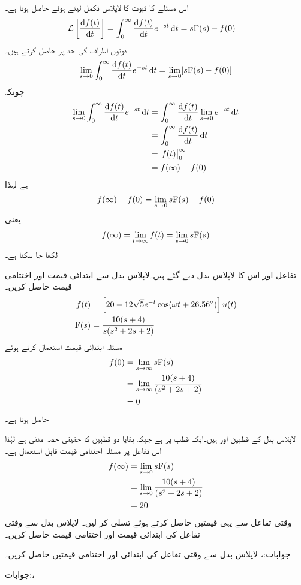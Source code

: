 اس مسئلے کا ثبوت  کا لاپلاس تکمل لیتے ہوئے حاصل ہوتا ہے۔
\begin{align*}
\Laplace\left[\frac{\dif f(t)}{\dif t}\right]&=\int_0^{\infty} \frac{\dif f(t)}{\dif t} e^{-st} \dif t=s\bF(s)-f(0)
\end{align*}
دونوں اطراف کی حد  پر حاصل کرتے ہیں۔
\begin{align*}
\lim_{s \to 0}\int_0^{\infty} \frac{\dif f(t)}{\dif t} e^{-st} \dif t=\lim_{s \to 0}[s\bF(s)-f(0)]
\end{align*}
چونکہ
\begin{align*}
\lim_{s \to 0}\int_0^{\infty} \frac{\dif f(t)}{\dif t} e^{-st} \dif t&=\int_0^{\infty} \frac{\dif f(t)}{\dif t} \lim_{s \to 0}e^{-st} \dif t\\
&=\int_0^{\infty} \frac{\dif f(t)}{\dif t} \dif t\\
&=\left. f(t) \right|_{0}^{\infty}\\
&=f(\infty)-f(0)
\end{align*}
ہے لہٰذا
\begin{align*}
f(\infty)-f(0)=\lim_{s \to 0} s{{\textup{F}}}(s)-f(0)
\end{align*}
یعنی
\begin{align*}
f(\infty)=\lim_{t \to \infty}f(t)=\lim_{s \to 0} s{{\textup{F}}}(s)
\end{align*}
لکھا جا سکتا ہے۔

تفاعل اور اس کا لاپلاس بدل دیے گئے ہیں۔لاپلاس بدل سے ابتدائی قیمت  اور اختتامی قیمت  حاصل کریں۔
\begin{align*}
f(t)&=\left[20-12\sqrt{5} e^{-t} \cos(\omega t+26.56^{\circ})\right]u(t)\\
{{\textup{F}}}(s)&=\frac{10(s+4)}{s(s^2+2s+2)}
\end{align*}
مسئلہ ابتدائی قیمت استعمال کرتے ہوئے
\begin{align*}
f(0)&=\lim_{s \to \infty} s{{\textup{F}}}(s)\\
&=\lim_{s \to \infty} \frac{10(s+4)}{(s^2+2s+2)}\\
&=0
\end{align*}
حاصل ہوتا ہے۔

لاپلاس بدل کے قطبین  اور   ہیں۔ایک قطب  پر ہے جبکہ بقایا دو قطبین کا حقیقی حصہ منفی ہے لہٰذا اس تفاعل پر مسئلہ اختتامی قیمت قابل استعمال ہے۔
\begin{align*}
f(\infty)&=\lim_{s \to 0} s{{\textup{F}}}(s)\\
&=\lim_{s \to 0} \frac{10(s+4)}{(s^2+2s+2)}\\
&=20
\end{align*}
وقتی تفاعل  سے یہی قیمتیں حاصل کرتے ہوئے تسلی کر لیں۔
لاپلاس بدل  سے وقتی تفاعل  کی ابتدائی قیمت اور اختتامی قیمت حاصل کریں۔

جوابات:، 
لاپلاس بدل  سے وقتی تفاعل کی ابتدائی اور اختتامی قیمتیں حاصل کریں۔

جوابات:، 
